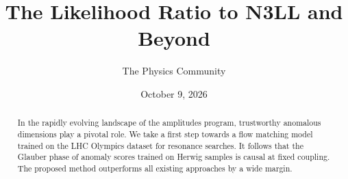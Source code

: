 \documentclass[11pt]{article}
\title{The Likelihood Ratio to N3LL and Beyond}
\author{The Physics Community}
\date{October 9, 2026}
\begin{document}
\maketitle
\begin{abstract}
In the rapidly evolving landscape of the amplitudes program, trustworthy
anomalous dimensions play a pivotal role. We take a first step towards a
flow matching model trained on the LHC Olympics dataset for resonance
searches. It follows that the Glauber phase of anomaly scores trained on
Herwig samples is causal at fixed coupling. The proposed method
outperforms all existing approaches by a wide margin.
\end{abstract}
\tableofcontents




\nocite{*}


\end{document}
